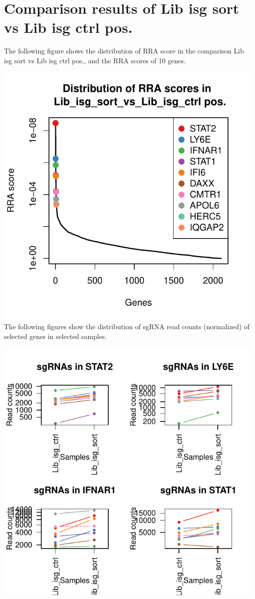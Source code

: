 \documentclass{article}
\begin{document}
\newpage\section{Comparison results of Lib isg sort vs Lib isg ctrl pos.}

The following figure shows the distribution of RRA score in the comparison Lib isg sort vs Lib isg ctrl pos., and the RRA scores of 10 genes.

%


\includegraphics{MageckLibISG_CoVclust_summary-009}
\clearpage
\newpage
The following figures show the distribution of sgRNA read counts (normalized) of selected genes in selected samples.
%


\includegraphics{MageckLibISG_CoVclust_summary-010}
%
\end{document}
